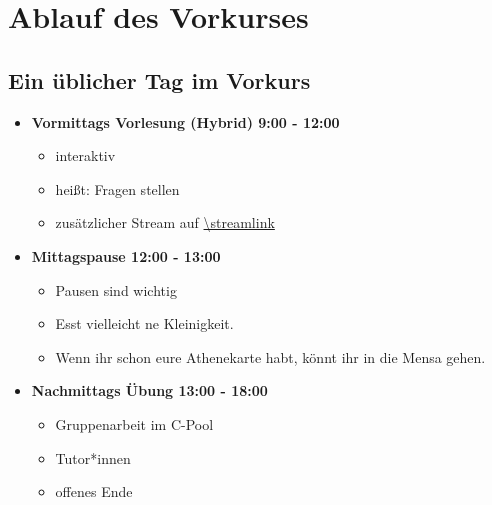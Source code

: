 \section{Ablauf des Vorkurses}
\subsection{Ein üblicher Tag im Vorkurs}
\begin{frame}
    \slidehead
    \begin{itemize}
        \item \textbf{Vormittags Vorlesung (Hybrid) 9:00 - 12:00}
            \begin{itemize}
                \item interaktiv
                \item heißt: Fragen stellen
                \item zusätzlicher Stream auf \url{\streamlink}
            \end{itemize}
            \pause
        \item \textbf{Mittagspause 12:00 - 13:00}
            \begin{itemize}
                \item Pausen sind wichtig
                \item Esst vielleicht ne Kleinigkeit.
                \item Wenn ihr schon eure Athenekarte habt, könnt ihr in die Mensa gehen.
            \end{itemize}
            \pause
        \item \textbf{Nachmittags Übung 13:00 - 18:00}
            \begin{itemize}
                \item Gruppenarbeit im C-Pool
                \item Tutor*innen
                \item offenes Ende
            \end{itemize}
    \end{itemize}
\end{frame}

